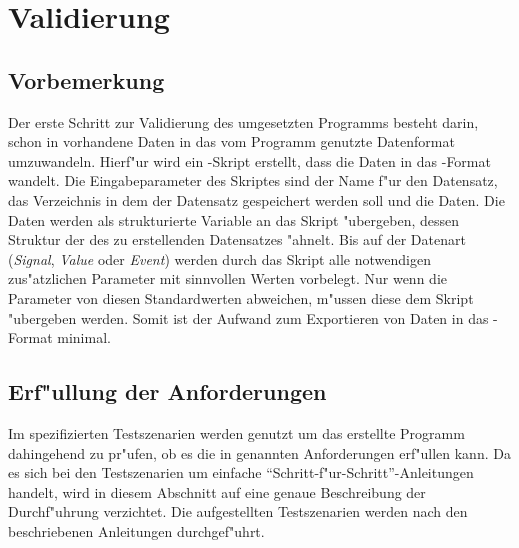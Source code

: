 \chapter{Validierung}
\label{chap:validierung}

\section{Vorbemerkung}
\label{sec:validierung_vorbereitung}

Der erste Schritt zur Validierung des umgesetzten Programms besteht darin, schon in \ml vorhandene Daten in das vom Programm genutzte Datenformat umzuwandeln.
Hierf"ur wird ein \mlNS-Skript erstellt, dass die Daten in das \usNS-Format wandelt.
Die Eingabeparameter des Skriptes sind der Name f"ur den Datensatz, das Verzeichnis in dem der Datensatz gespeichert werden soll und die Daten.
Die Daten werden als strukturierte Variable an das Skript "ubergeben, dessen Struktur der des zu erstellenden Datensatzes "ahnelt.
Bis auf der Datenart (\emph{Signal}, \emph{Value} oder \emph{Event}) werden durch das Skript alle notwendigen zus"atzlichen Parameter mit sinnvollen Werten vorbelegt.
Nur wenn die Parameter von diesen Standardwerten abweichen, m"ussen diese dem Skript "ubergeben werden.
Somit ist der Aufwand zum Exportieren von Daten in das \usNS-Format minimal.


\section{Erf"ullung der Anforderungen}
\label{sec:anforderungsvalidierung}

Im  spezifizierten Testszenarien werden genutzt um das erstellte Programm dahingehend zu pr"ufen, ob es die in  genannten Anforderungen erf"ullen kann.
Da es sich bei den Testszenarien um einfache "`Schritt-f"ur-Schritt"'-Anleitungen handelt, wird in diesem Abschnitt auf eine genaue Beschreibung der Durchf"uhrung verzichtet.
Die aufgestellten Testszenarien werden nach den beschriebenen Anleitungen durchgef"uhrt.

